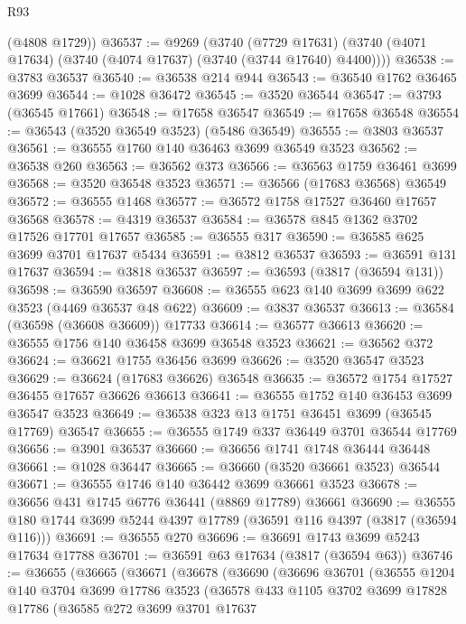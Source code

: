 \begin{lexlean}{R93}
\begin{coremodule}
      (@4808 @1729))
@36537 := @9269
    (@3740
      (@7729 @17631)
      (@3740 (@4071 @17634) (@3740 (@4074 @17637) (@3740 (@3744 @17640) @4400))))
@36538 := @3783 @36537
@36540 := @36538 @214 @944
@36543 := @36540 @1762 @36465 @3699
@36544 := @1028 @36472
@36545 := @3520 @36544
@36547 := @3793 (@36545 @17661)
@36548 := @17658 @36547
@36549 := @17658 @36548
@36554 := @36543 (@3520 @36549 @3523) (@5486 @36549)
@36555 := @3803 @36537
@36561 := @36555 @1760 @140 @36463 @3699 @36549 @3523
@36562 := @36538 @260
@36563 := @36562 @373
@36566 := @36563 @1759 @36461 @3699
@36568 := @3520 @36548 @3523
@36571 := @36566 (@17683 @36568) @36549
@36572 := @36555 @1468
@36577 := @36572 @1758 @17527 @36460 @17657 @36568
@36578 := @4319 @36537
@36584 := @36578 @845 @1362 @3702 @17526 @17701 @17657
@36585 := @36555 @317
@36590 := @36585 @625 @3699 @3701 @17637 @5434
@36591 := @3812 @36537
@36593 := @36591 @131 @17637
@36594 := @3818 @36537
@36597 := @36593 (@3817 (@36594 @131))
@36598 := @36590 @36597
@36608 := @36555 @623 @140 @3699 @3699 @622 @3523 (@4469 @36537 @48 @622)
@36609 := @3837 @36537
@36613 := @36584 (@36598 (@36608 @36609)) @17733
@36614 := @36577 @36613
@36620 := @36555 @1756 @140 @36458 @3699 @36548 @3523
@36621 := @36562 @372
@36624 := @36621 @1755 @36456 @3699
@36626 := @3520 @36547 @3523
@36629 := @36624 (@17683 @36626) @36548
@36635 := @36572 @1754 @17527 @36455 @17657 @36626 @36613
@36641 := @36555 @1752 @140 @36453 @3699 @36547 @3523
@36649 := @36538 @323 @13 @1751 @36451 @3699 (@36545 @17769) @36547
@36655 := @36555 @1749 @337 @36449 @3701 @36544 @17769
@36656 := @3901 @36537
@36660 := @36656 @1741 @1748 @36444 @36448
@36661 := @1028 @36447
@36665 := @36660 (@3520 @36661 @3523) @36544
@36671 := @36555 @1746 @140 @36442 @3699 @36661 @3523
@36678 := @36656 @431 @1745 @6776 @36441 (@8869 @17789) @36661
@36690 := @36555 @180 @1744 @3699 @5244 @4397 @17789 (@36591 @116 @4397 (@3817 (@36594 @116)))
@36691 := @36555 @270
@36696 := @36691 @1743 @3699 @5243 @17634 @17788
@36701 := @36591 @63 @17634 (@3817 (@36594 @63))
@36746 := @36655
    (@36665
      (@36671
        (@36678
          (@36690
            (@36696
              @36701
              (@36555
                @1204
                @140
                @3704
                @3699
                @17786
                @3523
                (@36578
                  @433
                  @1105
                  @3702
                  @3699
                  @17828
                  @17786
                  (@36585
                    @272
                    @3699
                    @3701
                    @17637

\end{coremodule}
\end{lexlean}
